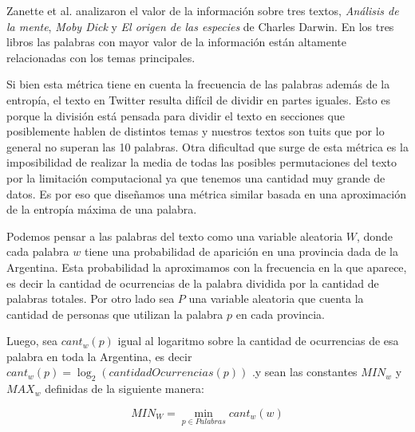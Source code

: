 Zanette et al. analizaron el valor de la información sobre tres textos, \textit{Análisis de la mente}, 
\textit{Moby Dick} y \textit{El origen de las especies} de Charles Darwin. 
En los tres libros las palabras con mayor valor de la información están 
altamente relacionadas con los temas principales.

Si bien esta métrica tiene en cuenta la frecuencia de las palabras además de la 
entropía, el texto en Twitter resulta difícil de dividir en partes iguales. 
Esto es porque la división está pensada para dividir el texto en secciones que 
posiblemente hablen de distintos temas y nuestros textos son tuits que por lo general no superan las 10 palabras.
Otra dificultad que surge de esta métrica es la imposibilidad de realizar la media 
de todas las posibles permutaciones del texto por la limitación computacional ya que 
tenemos una cantidad muy grande de datos. Es por eso que diseñamos una métrica similar basada en una aproximación de la entropía máxima de una palabra.

Podemos pensar a las palabras del texto como una variable aleatoria $W$, donde cada palabra $w$ tiene una probabilidad de aparición en una provincia dada de la Argentina. Esta probabilidad la aproximamos con la frecuencia en la que aparece, es decir la cantidad de ocurrencias de la palabra dividida por la cantidad de palabras totales.
Por otro lado sea $P$ una variable aleatoria que cuenta la cantidad de personas que 
utilizan la palabra $p$ en cada provincia.

\medskip

Luego, sea $cant_w(p)$ igual al logaritmo sobre la cantidad de ocurrencias de esa palabra en toda la Argentina, es decir $cant_w(p) = \log_2(cantidadOcurrencias(p))$ .y sean las constantes $MIN_w$ y $MAX_w$ definidas de la siguiente manera:



\begin{equation}
MIN_W = \min\limits_{p \in Palabras} cant_w(w)
\end{equation}

